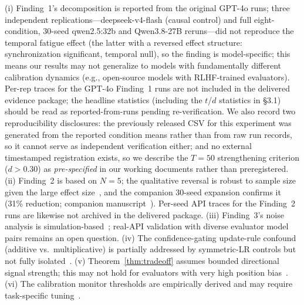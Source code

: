 \documentclass[11pt]{article}
\theoremstyle{definition}
\theoremstyle{remark}
\begin{document}
(i) Finding~1's decomposition is reported from the original GPT-4o runs; three independent replications---deepseek-v4-flash (causal control) and full eight-condition, 30-seed qwen2.5:32b and Qwen3.8-27B reruns---did not reproduce the temporal fatigue effect (the latter with a reversed effect structure: synchronization significant, temporal null), so the finding is model-specific; this means our results may not generalize to models with fundamentally different calibration dynamics (e.g., open-source models with RLHF-trained evaluators). Per-rep traces for the GPT-4o Finding~1 runs are not included in the delivered evidence package; the headline statistics (including the $t$/$d$ statistics in \S3.1) should be read as reported-from-runs pending re-verification. We also record two reproducibility disclosures: the previously released CSV for this experiment was generated from the reported condition means rather than from raw run records, so it cannot serve as independent verification either; and no external timestamped registration exists, so we describe the $T{=}50$ strengthening criterion ($d > 0.30$) as \emph{pre-specified} in our working documents rather than preregistered. (ii) Finding~2 is based on $N{=}5$; the qualitative reversal is robust to sample size given the large effect size~\citep{lehmann1998theory}, and the companion 30-seed expansion confirms it (31\% reduction; companion manuscript~\citep{companion2026}). Per-seed API traces for the Finding~2 runs are likewise not archived in the delivered package. (iii) Finding~3's noise analysis is simulation-based~\citep{resampling2026}; real-API validation with diverse evaluator model pairs remains an open question. (iv) The confidence-gating update-rule confound (additive vs.\ multiplicative) is partially addressed by symmetric-LR controls but not fully isolated~\citep{boundarysync2026}. (v) Theorem~\ref{thm:tradeoff} assumes bounded directional signal strength; this may not hold for evaluators with very high position bias~\citep{tversky1974anchoring}. (vi) The calibration monitor thresholds are empirically derived and may require task-specific tuning~\citep{naeini2015obtaining,jiang2021can}.

\end{document}
